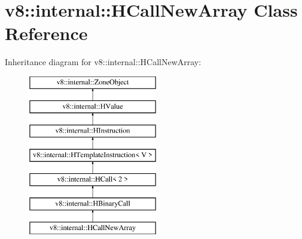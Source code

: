 \hypertarget{classv8_1_1internal_1_1_h_call_new_array}{}\section{v8\+:\+:internal\+:\+:H\+Call\+New\+Array Class Reference}
\label{classv8_1_1internal_1_1_h_call_new_array}
Inheritance diagram for v8\+:\+:internal\+:\+:H\+Call\+New\+Array\+:\begin{figure}[H]
\begin{center}
\leavevmode
\includegraphics[height=7.000000cm]{classv8_1_1internal_1_1_h_call_new_array}
\end{center}
\end{figure}
